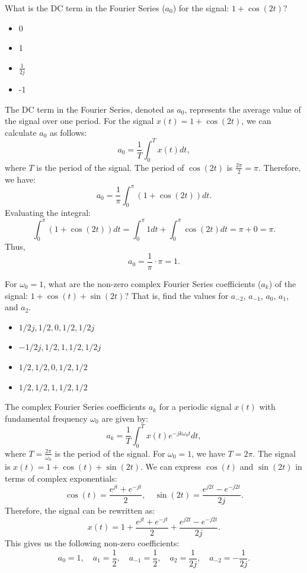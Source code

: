 \begin{popquiz}
    What is the DC term in the Fourier Series ($a_0$) for the signal: $1 + \cos(2t)$?
    \begin{itemize}
        \item 0
        \item 1
        \item $\frac{1}{2j}$
        \item -1
    \end{itemize}
    \popqsplit
    The DC term in the Fourier Series, denoted as $a_0$, represents the average value of the signal over one period. For the signal $x(t) = 1 + \cos(2t)$, we can calculate $a_0$ as follows:
    \[
    a_0 = \frac{1}{T} \int_{0}^{T} x(t) dt,
    \]
    where $T$ is the period of the signal. The period of $\cos(2t)$ is $\frac{2\pi}{2} = \pi$. Therefore, we have:
    \[
    a_0 = \frac{1}{\pi} \int_{0}^{\pi} (1 + \cos(2t)) dt.
    \]
    Evaluating the integral:
    \[
    \int_{0}^{\pi} (1 + \cos(2t)) dt = \int_{0}^{\pi} 1 dt + \int_{0}^{\pi} \cos(2t) dt = \pi + 0 = \pi.
    \]
    Thus,
    \[
    a_0 = \frac{1}{\pi} \cdot \pi = 1.
    \]
\end{popquiz}

\begin{popquiz}
    For $\omega_0 = 1$, what are the non-zero complex Fourier Series coefficients ($a_k$) of the signal: $1 + \cos(t) + \sin(2t)$? That is, find the values for $a_{-2}$, $a_{-1}$, $a_0$, $a_1$, and $a_2$.
    \begin{itemize}
        \item $1/2j, 1/2, 0, 1/2, 1/2j$
        \item $-1/2j, 1/2, 1, 1/2, 1/2j$
        \item $1/2, 1/2, 0, 1/2, 1/2$
        \item $1/2, 1/2, 1, 1/2, 1/2$
    \end{itemize}

    \popqsplit
    The complex Fourier Series coefficients $a_k$ for a periodic signal $x(t)$ with fundamental frequency $\omega_0$ are given by:
    \[
    a_k = \frac{1}{T} \int_{0}^{T} x(t) e^{-j k \omega_0 t} dt,
    \]
    where $T = \frac{2\pi}{\omega_0}$ is the period of the signal. For $\omega_0 = 1$, we have $T = 2\pi$. The signal is $x(t) = 1 + \cos(t) + \sin(2t)$.
    We can express $\cos(t)$ and $\sin(2t)$ in terms of complex exponentials:
    \[
    \cos(t) = \frac{e^{j t} + e^{-j t}}{2}, \quad \sin(2t) = \frac{e^{j 2t} - e^{-j 2t}}{2j}.
    \]
    Therefore, the signal can be rewritten as:
    \[
    x(t) = 1 + \frac{e^{j t} + e^{-j t}}{2} + \frac{e^{j 2t} - e^{-j 2t}}{2j}.
    \]
    This gives us the following non-zero coefficients:
    \[ 
    a_0 = 1, \quad a_1 = \frac{1}{2}, \quad a_{-1} = \frac{1}{2}, \quad a_2 = \frac{1}{2j}, \quad a_{-2} = -\frac{1}{2j}.
    \]
\end{popquiz}
